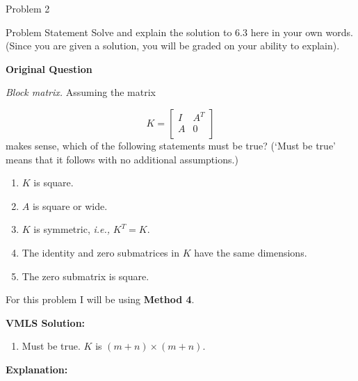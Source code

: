 \begin{problem}{Problem 2}
    \begin{statement}{Problem Statement}
        Solve and explain the solution to 6.3  here in your own words. (Since you are given a solution, you will be graded on your ability to explain). \vspace*{1em}

        \noindent \textbf{Original Question} \vspace*{1em}

        \textit{Block matrix.} Assuming the matrix

        \begin{equation*}
            K = 
            \begin{bmatrix}
                I & A^{T} \\
                A & 0 \\
            \end{bmatrix}
        \end{equation*}
        makes sense, which of the following statements must be true? (`Must be true' means that it follows with no additional assumptions.)

        \begin{enumerate}[label = (\alph*)]
            \item $K$ is square.
            \item $A$ is square or wide.
            \item $K$ is symmetric, \textit{i.e.,} $K^{T} = K$.
            \item The identity and zero submatrices in $K$ have the same dimensions.
            \item The zero submatrix is square.
        \end{enumerate}
    \end{statement}

    \begin{Highlight}
        For this problem I will be using \textbf{Method 4}. \vspace*{1em}

        \noindent \textbf{VMLS Solution:}

        \begin{enumerate}[label = (\alph*)]
            \item Must be true. $K$ is $(m + n) \times (m + n)$.
        \end{enumerate}

        \noindent \textbf{Explanation:}


\end{Highlight}
\end{problem}
